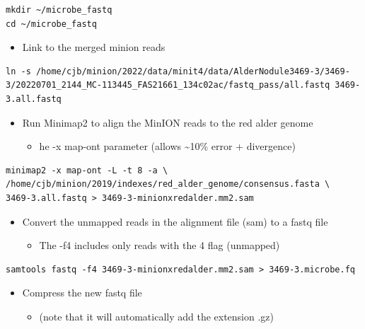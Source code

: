\documentclass[
]{book}
\providecommand{\tightlist}{%
  \setlength{\itemsep}{0pt}\setlength{\parskip}{0pt}}
\begin{document}
\begin{verbatim}
mkdir ~/microbe_fastq
cd ~/microbe_fastq
\end{verbatim}

\begin{itemize}
\tightlist
\item
  Link to the merged minion reads
\end{itemize}

\begin{verbatim}
ln -s /home/cjb/minion/2022/data/minit4/data/AlderNodule3469-3/3469-3/20220701_2144_MC-113445_FAS21661_134c02ac/fastq_pass/all.fastq 3469-3.all.fastq
\end{verbatim}

\begin{itemize}
\tightlist
\item
  Run Minimap2 to align the MinION reads to the red alder genome

  \begin{itemize}
  \tightlist
  \item
    he -x map-ont parameter (allows \textasciitilde10\% error + divergence)
  \end{itemize}
\end{itemize}

\begin{verbatim}
minimap2 -x map-ont -L -t 8 -a \
/home/cjb/minion/2019/indexes/red_alder_genome/consensus.fasta \
3469-3.all.fastq > 3469-3-minionxredalder.mm2.sam
\end{verbatim}

\begin{itemize}
\tightlist
\item
  Convert the unmapped reads in the alignment file (sam) to a fastq file

  \begin{itemize}
  \tightlist
  \item
    The -f4 includes only reads with the 4 flag (unmapped)
  \end{itemize}
\end{itemize}

\begin{verbatim}
samtools fastq -f4 3469-3-minionxredalder.mm2.sam > 3469-3.microbe.fq
\end{verbatim}

\begin{itemize}
\tightlist
\item
  Compress the new fastq file

  \begin{itemize}
  \tightlist
  \item
    (note that it will automatically add the extension .gz)
  \end{itemize}
\end{itemize}
\end{document}

